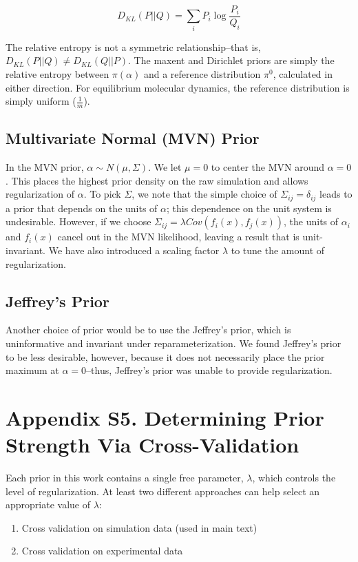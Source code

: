 \documentclass[12pt]{article}
\begin{document}
$$D_{KL}(P||Q) = \sum_i P_i \log \frac{P_i}{Q_i}$$

The relative entropy is not a symmetric relationship--that is, $D_{KL}(P||Q) \ne D_{KL}(Q||P)$.  The maxent and Dirichlet priors are simply the relative entropy between $\pi(\alpha)$ and a reference distribution $\pi^0$, calculated in either direction.    For equilibrium molecular dynamics, the reference distribution is simply uniform ($\frac{1}{m}$).


\subsection*{Multivariate Normal (MVN) Prior}

In the MVN prior, $\alpha \sim N(\mu,\Sigma)$.  We let $\mu = 0$ to center the MVN around $\alpha = 0$.  This places the highest prior density on the raw simulation and allows regularization of $\alpha$.  To pick $\Sigma$, we note that the simple choice of $\Sigma_{ij} = \delta_{ij}$ leads to a prior that depends on the units of $\alpha$; this dependence on the unit system is undesirable.  However, if we choose $\Sigma_{ij} = \lambda Cov(f_i(x), f_j(x))$, the units of $\alpha_i$ and $f_i(x)$ cancel out in the MVN likelihood, leaving a result that is unit-invariant.  We have also introduced a scaling factor $\lambda$ to tune the amount of regularization.


\subsection*{Jeffrey's Prior}

Another choice of prior would be to use the Jeffrey's prior, which is uninformative and invariant under reparameterization.  We found Jeffrey's prior to be less desirable, however, because it does not necessarily place the prior maximum at $\alpha = 0$--thus, Jeffrey's prior was unable to provide regularization. 

\newpage

\section*{Appendix S5.  Determining Prior Strength Via Cross-Validation}

Each prior in this work contains a single free parameter, $\lambda$, which controls the level of regularization.  At least two different approaches can help select an appropriate value of $\lambda$:

\begin{enumerate}
 \item Cross validation on simulation data (used in main text)
 \item Cross validation on experimental data
\end{enumerate}
\end{document}

